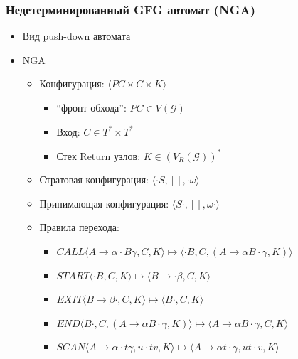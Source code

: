\documentclass{beamer}
\begin{document}
\begin{frame}
    \transwipe[direction=90]
    \frametitle{Недетерминированный GFG автомат (NGA)}
    \begin{itemize}
        \item Вид push-down автомата
        \item NGA
        \begin{itemize}
            \item Конфигурация: $\langle PC \times C \times K \rangle$
            \begin{itemize}
                \item ``фронт обхода'': $PC \in V(\mathcal{G})$
                \item Вход: $C \in T^{*} \times T^{*}$ 
                \item Стек Return узлов: $K \in (V_R(\mathcal{G}))^{*}$
            \end{itemize}
            \item Стратовая конфигурация: $\langle \cdot S, [], \cdot \omega \rangle$
            \item Принимающая конфигурация: $\langle S \cdot, [], \omega \cdot \rangle$
            \item Правила перехода:
            \begin{itemize}
                \item $CALL \langle A \rightarrow \alpha \cdot B \gamma, C, K \rangle \mapsto \langle \cdot B, C, (A \rightarrow \alpha B \cdot \gamma, K) \rangle$
                \item $START \langle \cdot B, C, K \rangle \mapsto \langle B \rightarrow \cdot \beta, C, K \rangle$
                \item $EXIT \langle B \rightarrow \beta \cdot, C, K \rangle \mapsto \langle B\cdot, C,  K \rangle$
               \item $END \langle B \cdot, C, (A \rightarrow \alpha B \cdot \gamma, K) \rangle \mapsto \langle A \rightarrow \alpha B \cdot \gamma, C, K \rangle$
                \item $SCAN \langle A \rightarrow \alpha \cdot t \gamma, u\cdot t v, K \rangle \mapsto \langle A \rightarrow \alpha t \cdot \gamma, u t \cdot v, K \rangle$
            \end{itemize}

        \end{itemize}
    \end{itemize}
\end{frame}
\end{document}
